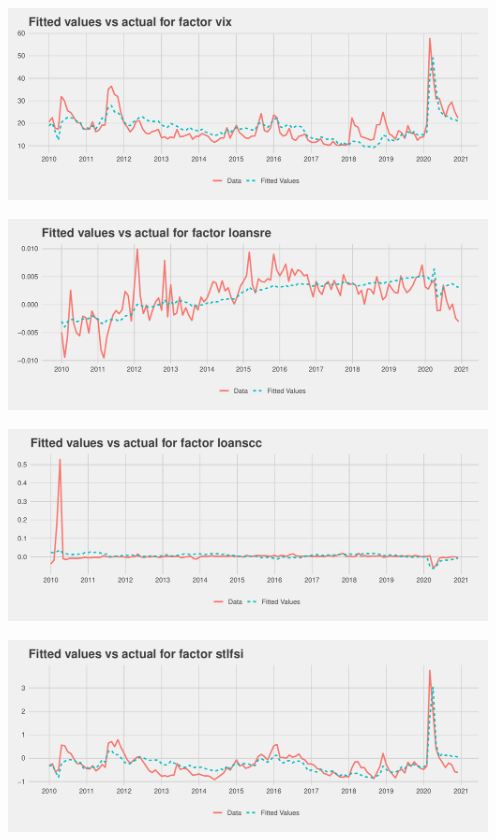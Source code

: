 \documentclass[11pt, letterpaper]{article}\usepackage[]{graphicx}\usepackage[]{color}
\begin{document}
{\centering \includegraphics[width=5in,height=2in]{figure/unnamed-chunk-20-15} 

}




{\centering \includegraphics[width=5in,height=2in]{figure/unnamed-chunk-20-16} 

}




{\centering \includegraphics[width=5in,height=2in]{figure/unnamed-chunk-20-17} 

}




{\centering \includegraphics[width=5in,height=2in]{figure/unnamed-chunk-20-18} 

}
\end{document}
